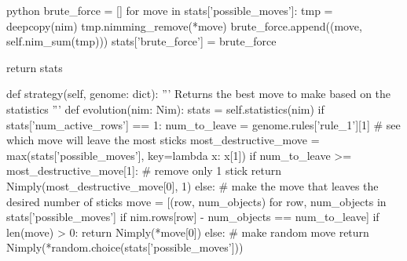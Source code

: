 \begin{mintedbox}{python}
        brute_force = []
        for move in stats['possible_moves']:
            tmp = deepcopy(nim)
            tmp.nimming_remove(*move)
            brute_force.append((move, self.nim_sum(tmp)))
        stats['brute_force'] = brute_force

        return stats

    def strategy(self, genome: dict):
        '''
        Returns the best move to make based on the statistics
        '''
        def evolution(nim: Nim):
            stats = self.statistics(nim)
            if stats['num_active_rows'] == 1:
                num_to_leave = genome.rules['rule_1'][1]
                # see which move will leave the most sticks
                most_destructive_move = max(stats['possible_moves'], key=lambda x: x[1])
                if num_to_leave >= most_destructive_move[1]:
                    # remove only 1 stick
                    return Nimply(most_destructive_move[0], 1)
                else:
                    # make the move that leaves the desired number of sticks
                    move = [(row, num_objects) for row, num_objects in stats['possible_moves'] if nim.rows[row] - num_objects == num_to_leave]
                    if len(move) > 0:
                        return Nimply(*move[0])
                    else:
                        # make random move
                        return Nimply(*random.choice(stats['possible_moves']))


\end{mintedbox}
